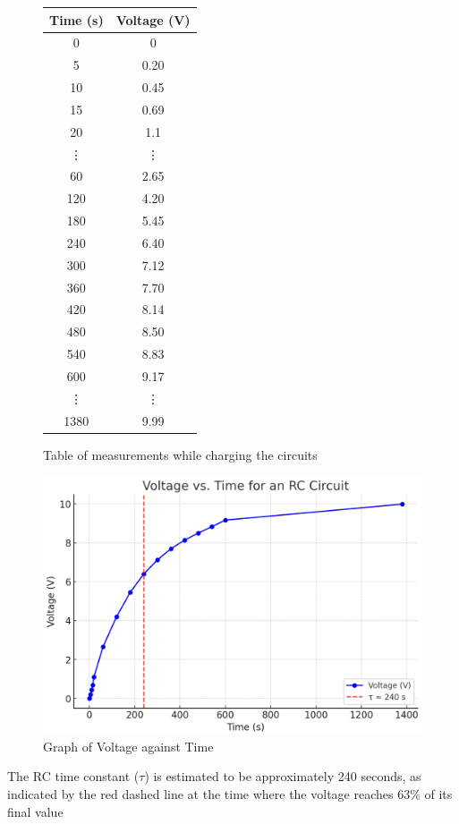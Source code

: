 \documentclass[a4paper]{article}
\begin{document}
\begin{figure}[H]
\centering
\begin{tabular}{|c|c|}
    \hline
    Time (s) & Voltage (V)\\
    \hline
    0 & 0\\
    5 & 0.20\\
    10 & 0.45\\
    15 & 0.69\\
    20 & 1.1\\
    \vdots & \vdots\\
    60 & 2.65\\
    120 & 4.20\\
    180 & 5.45\\
    240 & 6.40\\
    300 & 7.12\\
    360 & 7.70\\
    420 & 8.14\\
    480 & 8.50\\
    540 & 8.83\\
    600 & 9.17\\
    \vdots & \vdots\\
    1380 & 9.99\\
    \hline   
\end{tabular}
\caption{Table of measurements while charging the circuits}
\end{figure}

\begin{figure}[H]
    \centering
    \includegraphics[width=1\textwidth]{Exp5.png}
    \caption{Graph of Voltage against Time}
\end{figure}
\noindent
The RC time constant ($\tau$) is estimated to be approximately 240 seconds, as indicated by 
the red dashed line at the time where the voltage reaches $63\%$ of its final value
\end{document}
